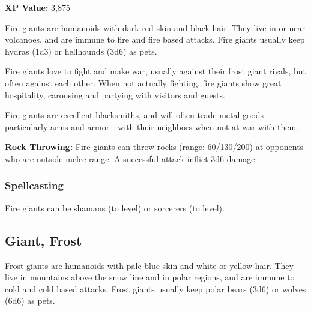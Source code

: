 \begin{multicols*}{2}
{\textbf{XP Value:} 3,875}

Fire giants are humanoids with dark red skin and black hair. They live in or near volcanoes, and are immune to fire and fire based attacks. Fire giants usually keep hydras (1d3) or hellhounds (3d6) as pets.

Fire giants love to fight and make war, usually against their frost giant rivals, but often against each other. When not actually fighting, fire giants show great hospitality, carousing and partying with visitors and guests.

Fire giants are excellent blacksmiths, and will often trade metal goods—particularly arms and armor—with their neighbors when not at war with them.

\textbf{Rock Throwing:} Fire giants can throw rocks (range: 60/130/200) at opponents who are outside melee range. A successful attack inflict 3d6 damage.

\subsubsection{Spellcasting}
Fire giants can be shamans (to  level) or sorcerers (to  level).

\subsection{Giant, Frost}

Frost giants are humanoids with pale blue skin and white or yellow hair. They live in mountains above the snow line and in polar regions, and are immune to cold and cold based attacks. Frost giants usually keep polar bears (3d6) or wolves (6d6) as pets.


\end{multicols*}
